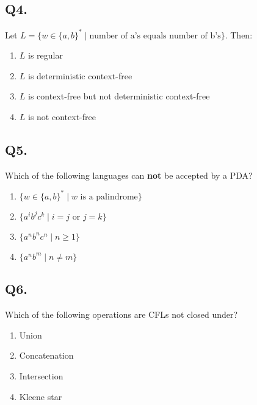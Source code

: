 \vspace{1em}

\subsection*{Q4.}
Let $L = \{w \in \{a, b\}^* \mid \text{number of a’s equals number of b’s}\}$. Then:

\begin{enumerate}[label=(\alph*)]
    \item $L$ is regular  
    \item $L$ is deterministic context-free  
    \item $L$ is context-free but not deterministic context-free  
    \item $L$ is not context-free  
\end{enumerate}

\vspace{1em}

\subsection*{Q5.}
Which of the following languages can \textbf{not} be accepted by a PDA?

\begin{enumerate}[label=(\alph*)]
    \item $\{w \in \{a,b\}^* \mid w \text{ is a palindrome} \}$  
    \item $\{a^i b^j c^k \mid i = j \text{ or } j = k \}$  
    \item $\{a^n b^n c^n \mid n \geq 1\}$  
    \item $\{a^n b^m \mid n \neq m\}$  
\end{enumerate}

\vspace{1em}

\subsection*{Q6.}
Which of the following operations are CFLs not closed under?

\begin{enumerate}[label=(\alph*)]
    \item Union  
    \item Concatenation  
    \item Intersection  
    \item Kleene star  
\end{enumerate}


